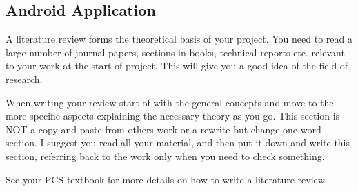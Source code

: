 \subsection{Android Application}


A literature review forms the theoretical basis of your project. You need to read a large number of
journal papers, sections in books, technical reports etc. relevant to your work at the start of project.
This will give you a good idea of the field of research.

When writing your review start of with the general concepts and move to the more specific aspects
explaining the necessary theory as you go. This section is NOT a copy and paste from others work or a
rewrite-but-change-one-word section. I suggest you read all your material, and then put it down and
write this section, referring back to the work only when you need to check something.

See your PCS textbook for more details on how to write a literature review.


